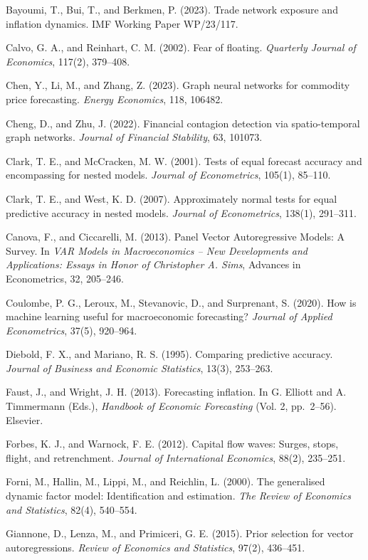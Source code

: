 \documentclass[
]{article}
\newcounter{none} %
\begin{document}
Bayoumi, T., Bui, T., and Berkmen, P. (2023). Trade network exposure and
inflation dynamics. IMF Working Paper WP/23/117.

Calvo, G. A., and Reinhart, C. M. (2002). Fear of floating.
\emph{Quarterly Journal of Economics}, 117(2), 379--408.

Chen, Y., Li, M., and Zhang, Z. (2023). Graph neural networks for
commodity price forecasting. \emph{Energy Economics}, 118, 106482.

Cheng, D., and Zhu, J. (2022). Financial contagion detection via
spatio-temporal graph networks. \emph{Journal of Financial Stability},
63, 101073.

Clark, T. E., and McCracken, M. W. (2001). Tests of equal forecast
accuracy and encompassing for nested models. \emph{Journal of
Econometrics}, 105(1), 85--110.

Clark, T. E., and West, K. D. (2007). Approximately normal tests for
equal predictive accuracy in nested models. \emph{Journal of
Econometrics}, 138(1), 291--311.

Canova, F., and Ciccarelli, M. (2013). Panel Vector Autoregressive Models: A Survey. In \emph{VAR Models in Macroeconomics -- New Developments and Applications: Essays in Honor of Christopher A. Sims}, Advances in Econometrics, 32, 205--246.

Coulombe, P. G., Leroux, M., Stevanovic, D., and Surprenant, S. (2020).
How is machine learning useful for macroeconomic forecasting?
\emph{Journal of Applied Econometrics}, 37(5), 920--964.

Diebold, F. X., and Mariano, R. S. (1995). Comparing predictive
accuracy. \emph{Journal of Business and Economic Statistics}, 13(3),
253--263.

Faust, J., and Wright, J. H. (2013). Forecasting inflation. In G.
Elliott and A. Timmermann (Eds.), \emph{Handbook of Economic
Forecasting} (Vol. 2, pp.~2--56). Elsevier.

Forbes, K. J., and Warnock, F. E. (2012). Capital flow waves: Surges,
stops, flight, and retrenchment. \emph{Journal of International
Economics}, 88(2), 235--251.

Forni, M., Hallin, M., Lippi, M., and Reichlin, L. (2000). The generalised dynamic factor model: Identification and estimation. \emph{The Review of Economics and Statistics}, 82(4), 540--554.

Giannone, D., Lenza, M., and Primiceri, G. E. (2015). Prior selection
for vector autoregressions. \emph{Review of Economics and Statistics},
97(2), 436--451.
\end{document}
